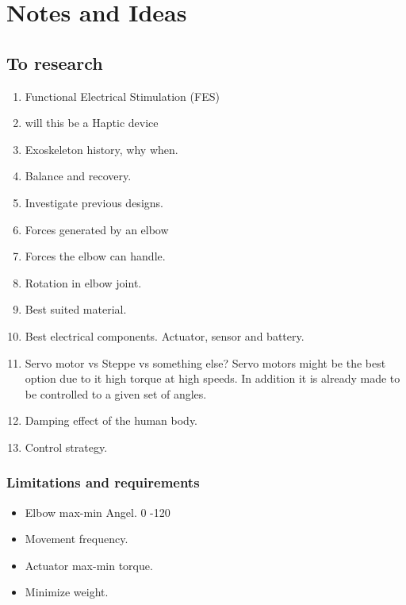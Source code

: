\chapter{Notes and Ideas}



\section{To research}
\begin{enumerate}
    \item Functional Electrical Stimulation (FES)
    \item will this be a Haptic device
    \item Exoskeleton history, why when. 
    \item Balance and recovery. 
    \item Investigate previous designs. 
    \item Forces generated by an elbow
    \item Forces the elbow can handle.
    \item Rotation in elbow joint.
    \item Best suited material.
    \item Best electrical components. Actuator, sensor and battery. 
    \item Servo motor vs Steppe vs something else? Servo motors might be the best option due to it high torque at high speeds. In addition it is already made to be controlled to a given set of angles. 
    \item Damping effect of the human body. 
    \item Control strategy. 
    
\end{enumerate}{}
\subsection{Limitations and requirements}
\begin{itemize}
    \item Elbow max-min Angel. 0 -120
    \item Movement frequency.
    \item Actuator max-min torque.
    \item Minimize weight. 
    
\end{itemize}{}


